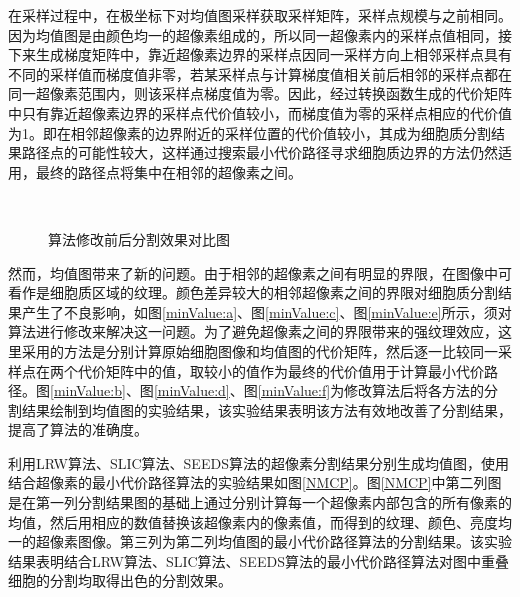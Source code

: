 \documentclass[nomlist,masters]{seuthesix}
\begin{document}
在采样过程中，在极坐标下对均值图采样获取采样矩阵，采样点规模与之前相同。因为均值图是由颜色均一的超像素组成的，所以同一超像素内的采样点值相同，接下来生成梯度矩阵中，靠近超像素边界的采样点因同一采样方向上相邻采样点具有不同的采样值而梯度值非零，若某采样点与计算梯度值相关前后相邻的采样点都在同一超像素范围内，则该采样点梯度值为零。因此，经过转换函数生成的代价矩阵中只有靠近超像素边界的采样点代价值较小，而梯度值为零的采样点相应的代价值为1。即在相邻超像素的边界附近的采样位置的代价值较小，其成为细胞质分割结果路径点的可能性较大，这样通过搜索最小代价路径寻求细胞质边界的方法仍然适用，最终的路径点将集中在相邻的超像素之间。

\begin{figure}[H]
\centering 
\hspace{0.01\textwidth}
\hspace{0.01\textwidth}
\vfill
\centering 
\hspace{0.01\textwidth}
\hspace{0.01\textwidth}
\caption{算法修改前后分割效果对比图}
\label{minValue}
\end{figure}

然而，均值图带来了新的问题。由于相邻的超像素之间有明显的界限，在图像中可看作是细胞质区域的纹理。颜色差异较大的相邻超像素之间的界限对细胞质分割结果产生了不良影响，如图\ref{minValue:a}、图\ref{minValue:c}、图\ref{minValue:e}所示，须对算法进行修改来解决这一问题。为了避免超像素之间的界限带来的强纹理效应，这里采用的方法是分别计算原始细胞图像和均值图的代价矩阵，然后逐一比较同一采样点在两个代价矩阵中的值，取较小的值作为最终的代价值用于计算最小代价路径。图\ref{minValue:b}、图\ref{minValue:d}、图\ref{minValue:f}为修改算法后将各方法的分割结果绘制到均值图的实验结果，该实验结果表明该方法有效地改善了分割结果，提高了算法的准确度。



利用LRW算法、SLIC算法、SEEDS算法的超像素分割结果分别生成均值图，使用结合超像素的最小代价路径算法的实验结果如图\ref{NMCP}。图\ref{NMCP}中第二列图是在第一列分割结果图的基础上通过分别计算每一个超像素内部包含的所有像素的均值，然后用相应的数值替换该超像素内的像素值，而得到的纹理、颜色、亮度均一的超像素图像。第三列为第二列均值图的最小代价路径算法的分割结果。该实验结果表明结合LRW算法、SLIC算法、SEEDS算法的最小代价路径算法对图中重叠细胞的分割均取得出色的分割效果。
\end{document}
